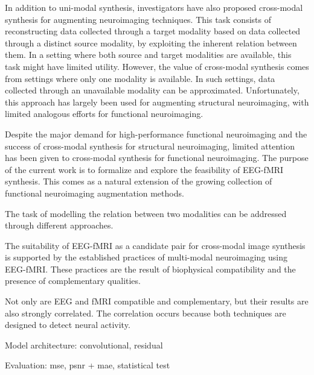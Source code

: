 \documentclass{article}
\begin{document}
In addition to uni-modal synthesis, investigators have also proposed cross-modal synthesis for augmenting neuroimaging techniques. This task consists of reconstructing data collected through a target modality based on data collected through a distinct source modality, by exploiting the inherent relation between them. In a setting where both source and target modalities are available, this task might have limited utility. However, the value of cross-modal synthesis comes from settings where only one modality is available. In such settings, data collected through an unavailable modality can be approximated. Unfortunately, this approach has largely been used for augmenting structural neuroimaging, with limited analogous efforts for functional neuroimaging.

Despite the major demand for high-performance functional neuroimaging and the success of cross-modal synthesis for structural neuroimaging, limited attention has been given to cross-modal synthesis for functional neuroimaging. The purpose of the current work is to formalize and explore the feasibility of EEG-fMRI synthesis. This comes as a natural extension of the growing collection of functional neuroimaging augmentation methods.

The task of modelling the relation between two modalities can be addressed through different approaches.

The suitability of EEG-fMRI as a candidate pair for cross-modal image synthesis is supported by the established practices of multi-modal neuroimaging using EEG-fMRI. These practices are the result of biophysical compatibility and the presence of complementary qualities. 

Not only are EEG and fMRI compatible and complementary, but their results are also strongly correlated. The correlation occurs because both techniques are designed to detect neural activity.

Model architecture: convolutional, residual

Evaluation: mse, psnr + mae, statistical test
\end{document}
